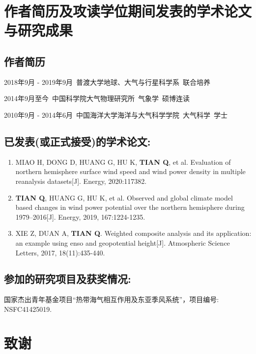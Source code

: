 \chapter{作者简历及攻读学位期间发表的学术论文与研究成果}


\section*{作者简历}

2018年9月 - 2019年9月~普渡大学地球、大气与行星科学系~联合培养

2014年9月至今~中国科学院大气物理研究所~气象学~硕博连读

2010年9月 - 2014年6月~中国海洋大学海洋与大气科学学院~大气科学~学士


\section*{已发表(或正式接受)的学术论文:}

{
\setlist[enumerate]{}%
\begin{enumerate}[nosep]
    \item MIAO H, DONG D, HUANG G, HU K, \textbf{TIAN Q}, et al. Evaluation of northern hemisphere surface wind speed and wind power density in multiple reanalysis datasets[J]. Energy, 2020:117382.
    
    \item \textbf{TIAN Q}, HUANG G, HU K, et al. Observed and global climate model based changes in wind power potential over the northern hemisphere during 1979–2016[J]. Energy, 2019, 167:1224-1235.
    
    \item XIE Z, DUAN A, \textbf{TIAN Q}. Weighted composite analysis and its application: an example using enso and geopotential height[J]. Atmospheric Science Letters, 2017, 18(11):435-440.
\end{enumerate}
}


\section*{参加的研究项目及获奖情况:}

国家杰出青年基金项目“热带海气相互作用及东亚季风系统”，项目编号: NSFC41425019.

\chapter[致谢]{致\quad 谢}%
\thispagestyle{noheaderstyle}%

